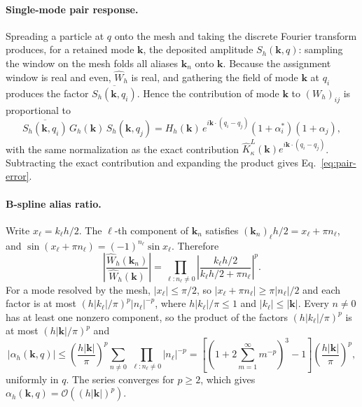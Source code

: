 \documentclass[11pt]{article}
\theoremstyle{plain}
\newcommand{\kk}{\bm k}
\DeclareRobustCommand{\_}{\textunderscore\allowbreak}
\begin{document}
\paragraph{Single-mode pair response.}
Spreading a particle at $q$ onto the mesh and taking the discrete Fourier
transform produces, for a retained mode $\kk$, the deposited amplitude
$S_h(\kk,q)$: sampling the window on the mesh folds all aliases
$\kk_n$ onto $\kk$. Because the assignment window is real and even,
$\widehat W_h$ is real, and gathering the field of mode $\kk$ at $q_i$
produces the factor $\overline{S_h(\kk,q_i)}$. Hence the contribution of
mode $\kk$ to $(W_h)_{ij}$ is proportional to
\begin{equation}
\overline{S_h(\kk,q_i)}\,G_h(\kk)\,S_h(\kk,q_j)
=
H_h(\kk)\,e^{i\kk\cdot(q_i-q_j)}
\left(1+\alpha_i^*\right)\left(1+\alpha_j\right),
\end{equation}
with the same normalization as the exact contribution
$\widehat K_\kappa^L(\kk)e^{i\kk\cdot(q_i-q_j)}$. Subtracting the exact
contribution and expanding the product gives Eq.~\eqref{eq:pair-error}.

\paragraph{B-spline alias ratio.}
Write $x_\ell=k_\ell h/2$. The $\ell$-th component of $\kk_n$ satisfies
$(\kk_n)_\ell h/2=x_\ell+\pi n_\ell$, and
$\sin(x_\ell+\pi n_\ell)=(-1)^{n_\ell}\sin x_\ell$. Therefore
\begin{equation}
\left|
\frac{\widehat W_h(\kk_n)}
{\widehat W_h(\kk)}
\right|
=
\prod_{\ell:n_\ell\ne0}
\left|
\frac{k_\ell h/2}
{k_\ell h/2+\pi n_\ell}
\right|^p.
\end{equation}
For a mode resolved by the mesh, $|x_\ell|\le\pi/2$, so
$|x_\ell+\pi n_\ell|\ge\pi|n_\ell|/2$ and each factor is at most
$(h|k_\ell|/\pi)^p|n_\ell|^{-p}$, where $h|k_\ell|/\pi\le1$ and
$|k_\ell|\le|\kk|$. Every $n\ne0$ has at least one nonzero component, so
the product of the factors $(h|k_\ell|/\pi)^p$ is at most
$(h|\kk|/\pi)^p$ and
\begin{equation}
|\alpha_h(\kk,q)|
\le
\left(\frac{h|\kk|}{\pi}\right)^p
\sum_{n\ne0}\ \prod_{\ell:n_\ell\ne0}|n_\ell|^{-p}
=
\left[
\left(1+2\sum_{m=1}^\infty m^{-p}\right)^3-1
\right]
\left(\frac{h|\kk|}{\pi}\right)^p,
\end{equation}
uniformly in $q$. The series converges for $p\ge2$, which gives
$\alpha_h(\kk,q)=\mathcal{O}((h|\kk|)^p)$.
\end{document}
